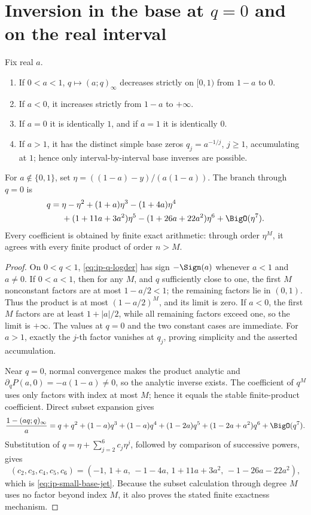 \section{\texorpdfstring{Inversion in the base at \(q=0\) and on the real interval}{Inversion in the base at q=0 and on the real interval}}
\label{sec:ip-real-base}

\begin{theorem}
\label{thm:ip-real-base}
Fix real \(a\).
\begin{enumerate}
\item If \(0<a<1\), \(q\mapsto(a;q)_\infty\) decreases strictly on
  \([0,1)\) from \(1-a\) to \(0\).
\item If \(a<0\), it increases strictly from \(1-a\) to \(+\infty\).
\item If \(a=0\) it is identically \(1\), and if \(a=1\) it is identically
  \(0\).
\item If \(a>1\), it has the distinct simple base zeros
  \(q_j=a^{-1/j}\), \(j\geq1\), accumulating at \(1\); hence only
  interval-by-interval base inverses are possible.
\end{enumerate}
For \(a\notin\{0,1\}\), set
\(\eta=((1-a)-y)/(a(1-a))\).  The branch through \(q=0\) is
\begin{align}
 q={}&\eta-\eta^2+(1+a)\eta^3-(1+4a)\eta^4 \notag\\
 &+(1+11a+3a^2)\eta^5-(1+26a+22a^2)\eta^6
 +\BigO(\eta^7).
 \label{eq:ip-small-base-jet}
\end{align}
Every coefficient is obtained by finite exact arithmetic: through order
\(\eta^M\), it agrees with every finite product of order \(n>M\).
\end{theorem}

\begin{proof}
On \(0<q<1\), \cref{eq:ip-q-logder} has sign \(-\Sign(a)\) whenever \(a<1\)
and \(a\ne0\).  If \(0<a<1\), then for any \(M\), and \(q\) sufficiently
close to one, the first \(M\) nonconstant factors are at most
\(1-a/2<1\); the remaining factors lie in \((0,1)\).  Thus the product is at
most \((1-a/2)^M\), and its limit is zero.  If \(a<0\), the first \(M\)
factors are at least \(1+|a|/2\), while all remaining factors exceed one, so
the limit is \(+\infty\).  The values at \(q=0\) and the two constant cases
are immediate.  For \(a>1\), exactly the \(j\)-th factor vanishes at
\(q_j\), proving simplicity and the asserted accumulation.

Near \(q=0\), normal convergence makes the product analytic and
\(\partial_qP(a,0)=-a(1-a)\ne0\), so the analytic inverse exists.  The
coefficient of \(q^M\) uses only factors with index at most \(M\); hence it
equals the stable finite-product coefficient.  Direct subset expansion gives
\[
 \frac{1-(aq;q)_\infty}{a}
 =q+q^2+(1-a)q^3+(1-a)q^4+(1-2a)q^5
 +(1-2a+a^2)q^6+\BigO(q^7).
\]
Substitution of \(q=\eta+\sum_{j=2}^{6}c_j\eta^j\), followed by comparison of
successive powers, gives
\[
 (c_2,c_3,c_4,c_5,c_6)
 =(-1,\,1+a,\,-1-4a,\,1+11a+3a^2,\,-1-26a-22a^2),
\]
which is \cref{eq:ip-small-base-jet}.  Because the subset calculation through
degree \(M\) uses no factor beyond index \(M\), it also proves the stated
finite exactness mechanism.
\end{proof}

